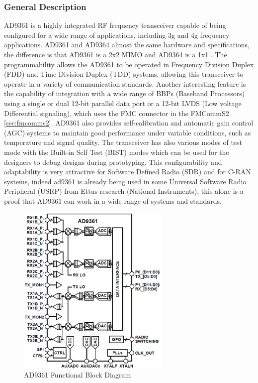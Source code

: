 \subsubsection{General Description}

AD9361 is a highly integrated RF frequency transceiver capable of being
configured for a wide range of applications, including 3g and 4g frequency
applications. AD9361 and AD9364 almost the same hardware and specifications, the
difference is that AD9361 is a 2x2 MIMO and AD9364 is a 1x1 \cite{ad9361_wiki}.
The programmability allows the AD9361 to be operated in Frequency Division
Duplex (FDD) and Time Division Duplex (TDD) systems, allowing this transceiver
to operate in a variety of communication standards. Another interesting feature
is the capability of integration with a wide range of BBPs (Baseband Processors)
using a single or dual 12-bit parallel data port or a 12-bit LVDS (Low voltage
Differential signaling), which uses the FMC connector in the FMCommS2
\ref{sec:fmcomms2}. AD9361 also provides self-calibration and automatic gain
control (AGC) systems to maintain good performance under variable conditions,
such as temperature and signal quality. The transceiver has also various modes
of test mode with the Built-in Self Test (BIST) modes which can be used for the
designers to debug designs during prototyping. This configurability and
adaptability is very attractive for Software Defined Radio (SDR) and for C-RAN
systems, indeed ad9361 is already being used in some Universal Software Radio
Peripheral (USRP) from Ettus research (National Instruments), this alone is a
proof that AD9361 can work in a wide range of systems and standards.

\begin{figure}[htbp]
    \centering
    \includegraphics[width=0.65\textwidth]{./figures/ad9361_functional_diagram}
    \caption{ AD9361 Functional Block Diagram
    \label{fig:ad9361func}}
\end{figure}

